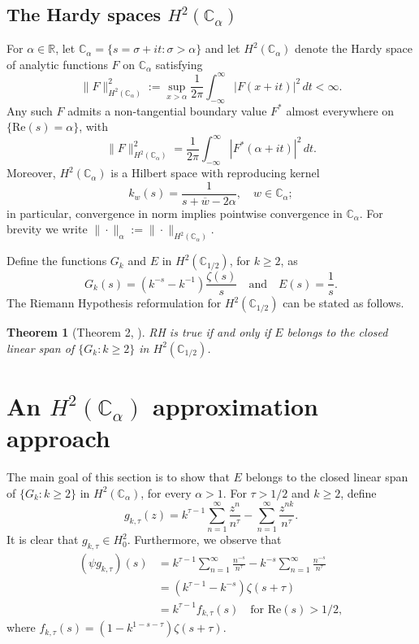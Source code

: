 \documentclass[11pt]{extarticle}
\numberwithin{equation}{section}
\theoremstyle{plain}
\newtheorem{theorem}{Theorem}[section]
\theoremstyle{remark}
\begin{document}
\subsection{The Hardy spaces $H^2(\mathbb{C}_\alpha)$}

For $\alpha \in \mathbb{R}$, let $\mathbb{C}_\alpha = \{s = \sigma + it : \sigma > \alpha\}$ and let $H^2(\mathbb{C}_\alpha)$ denote the Hardy space of analytic functions $F$ on $\mathbb{C}_\alpha$ satisfying
\[
\|F\|^2_{H^2(\mathbb{C}_\alpha)} := \sup_{x > \alpha} \frac{1}{2\pi} \int_{-\infty}^{\infty} |F(x + it)|^2 \, dt < \infty.
\]
Any such $F$ admits a non-tangential boundary value $F^*$ almost everywhere on $\{\mathrm{Re}(s) = \alpha\}$, with
\[
\|F\|^2_{H^2(\mathbb{C}_\alpha)} = \frac{1}{2\pi}\int_{-\infty}^{\infty} |F^*(\alpha + it)|^2 \, dt.
\]
Moreover, $H^2(\mathbb{C}_\alpha)$ is a Hilbert space with reproducing kernel
\[
k_w(s) = \frac{1}{s + \overline{w} - 2\alpha}, \quad w \in \mathbb{C}_\alpha;
\]
in particular, convergence in norm implies pointwise convergence in $\mathbb{C}_\alpha$. For brevity we write $\|\cdot\|_\alpha := \|\cdot\|_{H^2(\mathbb{C}_\alpha)}$.

Define the functions $G_k$ and $E$ in $H^2(\mathbb{C}_{1/2})$, for $k \geq 2$, as
\[
G_k(s) = (k^{-s} - k^{-1})\frac{\zeta(s)}{s} \quad \text{and} \quad E(s) = \frac{1}{s}.
\]
The Riemann Hypothesis reformulation for $H^2(\mathbb{C}_{1/2})$ can be stated as follows.

\begin{theorem}[Theorem 2, \cite{bagchi}]\label{thm:bagchi}
RH is true if and only if $E$ belongs to the closed linear span of $\{G_k : k \geq 2\}$ in $H^2(\mathbb{C}_{1/2})$.
\end{theorem}

\section{An $H^2(\mathbb{C}_\alpha)$ approximation approach}\label{sec:approx}

The main goal of this section is to show that $E$ belongs to the closed linear span 
of $\{G_k : k \geq 2\}$ in $H^2(\mathbb{C}_\alpha)$, for every $\alpha > 1$. 
For $\tau > 1/2$ and $k \geq 2$, define
\[
g_{k,\tau}(z) = k^{\tau-1}\sum_{n=1}^{\infty}\frac{z^n}{n^\tau} - \sum_{n=1}^{\infty}\frac{z^{nk}}{n^\tau}.
\]
It is clear that $g_{k,\tau} \in H^2_0$. Furthermore, we observe that
\begin{align*}
(\psi g_{k,\tau})(s) &= k^{\tau-1}\sum_{n=1}^{\infty}\frac{n^{-s}}{n^\tau} - k^{-s}\sum_{n=1}^{\infty}\frac{n^{-s}}{n^\tau}\\
&= (k^{\tau-1} - k^{-s})\zeta(s+\tau)\\
&= k^{\tau-1}f_{k,\tau}(s) \quad \text{for } \mathrm{Re}(s) > 1/2,
\end{align*}
where $f_{k,\tau}(s) = (1 - k^{1-s-\tau})\zeta(s+\tau)$.
\end{document}
